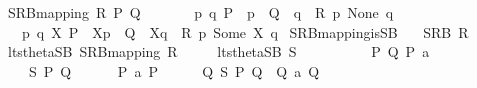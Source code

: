 \begin{isabellebody}
\ \ \ {\isacartoucheopen}SRB{\isacharunderscore}{\kern0pt}mapping\ R\ P\ Q\ {\isasymequiv}\ \isanewline
\ \ \ \ {\isacharparenleft}{\kern0pt}{\isasymexists}\ p\ q{\isachardot}{\kern0pt}\ P\ {\isacharequal}{\kern0pt}\ {\isasymtheta}{\isacharparenleft}{\kern0pt}p{\isacharparenright}{\kern0pt}\ {\isasymand}\ Q\ {\isacharequal}{\kern0pt}\ {\isasymtheta}{\isacharparenleft}{\kern0pt}q{\isacharparenright}{\kern0pt}\ {\isasymand}\ R\ p\ None\ q{\isacharparenright}{\kern0pt}\ {\isasymor}\isanewline
\ \ \ \ {\isacharparenleft}{\kern0pt}{\isasymexists}\ p\ q\ X{\isachardot}{\kern0pt}\ P\ {\isacharequal}{\kern0pt}\ {\isasymtheta}{\isacharbrackleft}{\kern0pt}X{\isacharbrackright}{\kern0pt}{\isacharparenleft}{\kern0pt}p{\isacharparenright}{\kern0pt}\ {\isasymand}\ Q\ {\isacharequal}{\kern0pt}\ {\isasymtheta}{\isacharbrackleft}{\kern0pt}X{\isacharbrackright}{\kern0pt}{\isacharparenleft}{\kern0pt}q{\isacharparenright}{\kern0pt}\ {\isasymand}\ R\ p\ {\isacharparenleft}{\kern0pt}Some\ X{\isacharparenright}{\kern0pt}\ q{\isacharparenright}{\kern0pt}{\isacartoucheclose}\isanewline
\isanewline
{}\isamarkupfalse%
\ SRB{\isacharunderscore}{\kern0pt}mapping{\isacharunderscore}{\kern0pt}is{\isacharunderscore}{\kern0pt}SB{\isacharcolon}{\kern0pt}\isanewline
\ \ \ {\isacartoucheopen}SRB\ R{\isacartoucheclose}\isanewline
\ \ \ {\isacartoucheopen}lts{\isacharunderscore}{\kern0pt}theta{\isachardot}{\kern0pt}SB\ {\isacharparenleft}{\kern0pt}SRB{\isacharunderscore}{\kern0pt}mapping\ R{\isacharparenright}{\kern0pt}{\isacartoucheclose}\isanewline
\ \ \ \ {\isacharparenleft}{\kern0pt}\ {\isacartoucheopen}lts{\isacharunderscore}{\kern0pt}theta{\isachardot}{\kern0pt}SB\ {\isacharquery}{\kern0pt}S{\isacartoucheclose}{\isacharparenright}{\kern0pt}\isanewline
%
\isadelimproof
%
\endisadelimproof
%
\isatagproof
{}\isamarkupfalse%
\ {\isacharminus}{\kern0pt}\isanewline
\ \ \isacommand{{\isacharbraceleft}{\kern0pt}}\isamarkupfalse%
\isanewline
\ \ \ \ \isamarkupfalse%
\ P\ Q\ P{\isacharprime}{\kern0pt}\ a\isanewline
\ \ \ \ \isamarkupfalse%
\isanewline
\ \ \ \ \ \ {\isacartoucheopen}{\isacharquery}{\kern0pt}S\ P\ Q{\isacartoucheclose}\isanewline
\ \ \ \ \ \ {\isacartoucheopen}P\ {\isasymlongmapsto}\isactrlsup {\isasymtheta}a\ P{\isacharprime}{\kern0pt}{\isacartoucheclose}\isanewline
\ \ \ \ \isamarkupfalse%
\ {\isacartoucheopen}{\isasymexists}Q{\isacharprime}{\kern0pt}{\isachardot}{\kern0pt}\ {\isacharquery}{\kern0pt}S\ P{\isacharprime}{\kern0pt}\ Q{\isacharprime}{\kern0pt}\ {\isasymand}\ Q\ {\isasymlongmapsto}\isactrlsup {\isasymtheta}a\ Q{\isacharprime}{\kern0pt}{\isacartoucheclose}\isanewline

\end{isabellebody}
